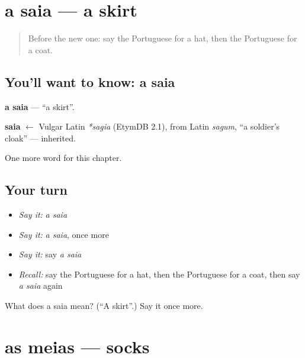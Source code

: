 \section[a saia]{a saia — a skirt}

\label{lesson:PT-C78-saia}



\begin{quote}
Before the new one: say the Portuguese for a hat, then the Portuguese for a coat.
\end{quote}

\subsection*{You'll want to know: a saia}
\textbf{a saia} — \textquotedblleft{}a skirt\textquotedblright{}.

\begin{cousinweb}
\textbf{saia} $\leftarrow$ Vulgar Latin \emph{*sagia} (EtymDB 2.1), from Latin \emph{sagum}, \textquotedblleft{}a soldier's cloak\textquotedblright{} — inherited.
\end{cousinweb}

\begin{grammarlens}[title={What you've built}]
One more word for this chapter.
\end{grammarlens}

\subsection*{Your turn}
\begin{itemize}
\raggedright
  \item \emph{Say it:} \emph{a saia}
  \item \emph{Say it:} \emph{a saia}, once more
  \item \emph{Say it:} say \emph{a saia}
  \item \emph{Recall:} say the Portuguese for a hat, then the Portuguese for a coat, then say \emph{a saia} again
\end{itemize}

\begin{tcolorbox}[breakable,colback=teal!4,colframe=teal!35!black,title={Before you move on}]
What does a saia mean? (\textquotedblleft{}A skirt\textquotedblright{}.) Say it once more.
\end{tcolorbox}
\section[as meias]{as meias — socks}

